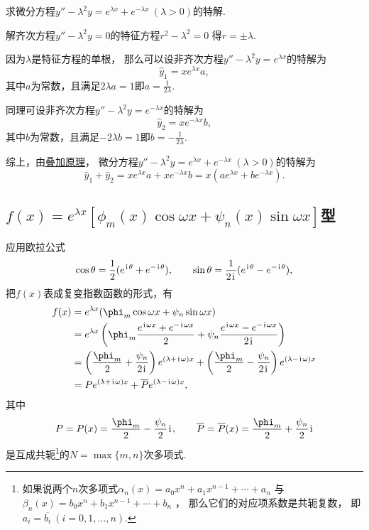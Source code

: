 \begin{example}
求微分方程\(y'' - \lambda^2 y = e^{\lambda x} + e^{-\lambda x}\ (\lambda>0)\)的特解.
\begin{solution}
解齐次方程\(y'' - \lambda^2 y = 0\)的特征方程\(r^2 - \lambda^2 = 0\)
得\(r = \pm\lambda\).

因为\(\lambda\)是特征方程的单根，
那么可以设非齐次方程\(y'' - \lambda^2 y = e^{\lambda x}\)的特解为\[
	\hat{y}_1 = x e^{\lambda x} a,
\]
其中\(a\)为常数，且满足\(2\lambda a = 1\)即\(a = \frac{1}{2\lambda}\).

同理可设非齐次方程\(y'' - \lambda^2 y = e^{-\lambda x}\)的特解为\[
	\hat{y}_2 = x e^{-\lambda x} b,
\]
其中\(b\)为常数，且满足\(-2\lambda b = 1\)即\(b = -\frac{1}{2\lambda}\).

综上，由\hyperref[theorem:微分方程.二阶非齐次线性微分方程的解的叠加原理]{叠加原理}，
微分方程\(y'' - \lambda^2 y = e^{\lambda x} + e^{-\lambda x}\ (\lambda>0)\)的特解为\[
	\hat{y}_1 + \hat{y}_2 = x e^{\lambda x} a + x e^{-\lambda x} b
	= x(a e^{\lambda x} + b e^{-\lambda x}).
\]
\end{solution}
\end{example}

\subsection{\texorpdfstring{\(f(x) = e^{\lambda x} [ \phi_m(x) \cos\omega x + \psi_n(x) \sin \omega x ]\)型}{第二类：指数函数与广义三角函数的乘积}}
应用欧拉公式\[
	\cos\theta = \frac{1}{2}(e^{\kern1pt\mathrm{i}\kern1pt\theta}+e^{-\kern1pt\mathrm{i}\kern1pt\theta}),
	\qquad
	\sin\theta = \frac{1}{2\kern1pt\mathrm{i}\kern1pt}(e^{\kern1pt\mathrm{i}\kern1pt\theta}-e^{-\kern1pt\mathrm{i}\kern1pt\theta}),
\]
把\(f(x)\)表成复变指数函数的形式，有\begin{align*}
	f(x) &= e^{\lambda x} ( \phi_m \cos \omega x + \psi_n \sin \omega x ) \\
	&= e^{\lambda x} \left(
	\phi_m \frac{e^{\iu\omega x}+e^{-\iu\omega x}}{2}
	+ \psi_n \frac{e^{\iu\omega x}-e^{-\iu\omega x}}{2\iu}
	\right) \\
	&= \left(\frac{\phi_m}{2}+\frac{\psi_n}{2\iu}\right) e^{(\lambda+\iu\omega)x}
	+ \left(\frac{\phi_m}{2}-\frac{\psi_n}{2\iu}\right) e^{(\lambda-\iu\omega)x} \\
	&= P e^{(\lambda+\iu\omega)x}
	+ \overline{P} e^{(\lambda-\iu\omega)x},
\end{align*}
其中\[
	P = P(x) = \frac{\phi_m}{2} - \frac{\psi_n}{2}\iu,
	\qquad
	\overline{P} = \overline{P}(x) = \frac{\phi_m}{2}+\frac{\psi_n}{2}\iu
\]是互成共轭\footnote{%
如果说两个\(n\)次多项式\(\alpha_n(x) = a_0 x^n + a_1 x^{n-1} + \dotsb + a_n\)
与\(\beta_n(x) = b_0 x^n + b_1 x^{n-1} + \dotsb + b_n\) ，
那么它们的对应项系数是共轭复数，
即\(a_i = \overline{b_i}\ (i=0,1,\dotsc,n)\).}的\(N = \max\{m,n\}\)次多项式.

